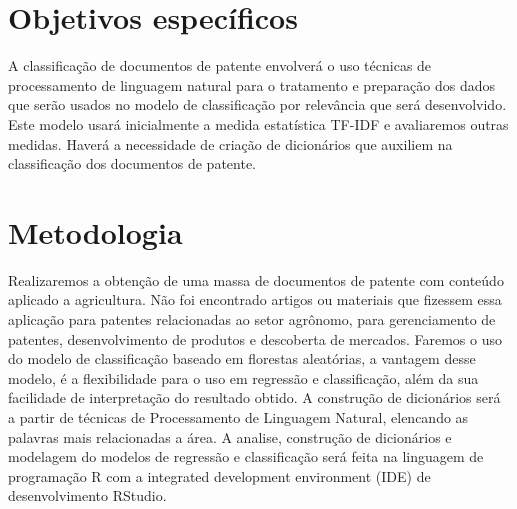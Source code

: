 \section{Objetivos específicos}
A classificação de documentos de patente envolverá o uso técnicas de processamento de linguagem natural para o tratamento e preparação dos dados que serão usados no modelo de classificação por relevância que será desenvolvido. Este modelo usará inicialmente a medida estatística TF-IDF e avaliaremos outras medidas. Haverá a necessidade de criação de dicionários que auxiliem na classificação dos documentos de patente.

\section{Metodologia}
Realizaremos a obtenção de uma massa de documentos de patente com conteúdo aplicado a agricultura. Não foi encontrado artigos ou materiais que fizessem essa aplicação para patentes relacionadas ao setor agrônomo, para gerenciamento de patentes, desenvolvimento de produtos e descoberta de mercados. Faremos o uso do modelo de classificação baseado em florestas aleatórias, a vantagem desse modelo, é a flexibilidade para o uso em regressão e classificação, além da sua facilidade de interpretação do resultado obtido.  A construção de dicionários será a partir de técnicas de Processamento de Linguagem Natural, elencando as palavras mais relacionadas a área. A analise, construção de dicionários e modelagem do modelos de regressão e classificação será feita na linguagem de programação R com a integrated development environment (IDE) de desenvolvimento RStudio.
